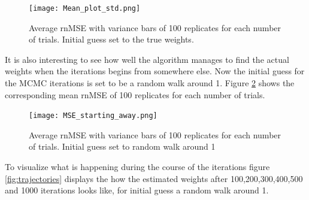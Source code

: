 \begin{figure}[hbt!]
\caption{Average rnMSE with variance bars of 100 replicates for each number of trials. Initial guess set to the true weights.}
\label{fig:case2_avg}
    \centering
    \texttt{[image: Mean\_plot\_std.png]}
\end{figure}



It is also interesting to see how well the algorithm manages to find the actual weights when the iterations begins from somewhere else. Now the initial guess for the MCMC iterations is set to be a random walk around 1. Figure \ref{fig:MSE2} shows the corresponding mean rnMSE of 100 replicates for each number of trials. 



\begin{figure}[hbt!]
\caption{Average rnMSE with variance bars of 100 replicates for each number of trials. Initial guess set to random walk around 1}
\label{fig:MSE2}
    \centering
    \texttt{[image: MSE\_starting\_away.png]}
\end{figure}

To visualize what is happening during the course of the iterations figure \ref{fig:trajectories} displays the how the estimated weights after 100,200,300,400,500 and 1000 iterations looks like, for initial guess a random walk around 1. 



